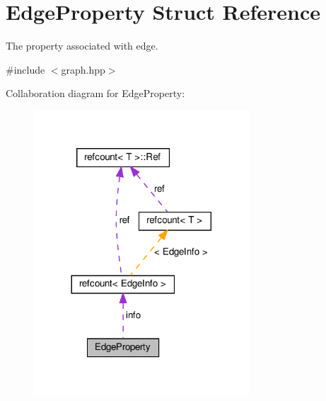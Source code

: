 \hypertarget{structEdgeProperty}{}\section{Edge\+Property Struct Reference}
\label{structEdgeProperty}


The property associated with edge.  




{\ttfamily \#include $<$graph.\+hpp$>$}



Collaboration diagram for Edge\+Property\+:
\nopagebreak
\begin{figure}[H]
\begin{center}
\leavevmode
\includegraphics[width=228pt]{d7/d00/structEdgeProperty__coll__graph}
\end{center}
\end{figure}
